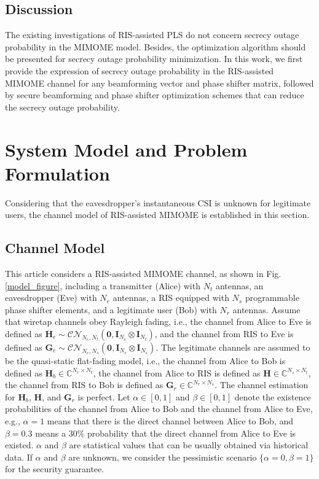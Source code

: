 \documentclass[journal]{IEEEtran}
\theoremstyle{definition}
\begin{document}
\subsection{Discussion}
The existing investigations of RIS-assisted PLS do not concern secrecy outage probability in the MIMOME model. Besides, the optimization algorithm should be presented for secrecy outage probability minimization. In this work, we first provide the expression of secrecy outage probability in the RIS-assisted MIMOME channel for any beamforming vector and phase shifter matrix, followed by secure beamforming and phase shifter optimization schemes that can reduce the secrecy outage probability.

\section{System Model and Problem Formulation}\label{model}

Considering that the eavesdropper's instantaneous CSI is unknown for legitimate users, the channel model of RIS-assisted MIMOME is established in this section. 

\subsection{Channel Model}

This article considers a RIS-assisted MIMOME channel, as shown in Fig. \ref{model_figure}, including a transmitter (Alice) with $N_t$ antennas, an eavesdropper (Eve) with $N_e$ antennas, a RIS equipped with $N_s$ programmable phase shifter elements, and a legitimate user (Bob) with $N_r$ antennas. Assume that wiretap channels obey  Rayleigh fading, i.e., the channel from Alice to Eve is defined as $\mathbf{H}_e\sim \mathcal{CN}_{N_e,N_t}(\mathbf{0},\mathbf{I}_{N_e}\otimes \mathbf{I}_{N_t})$, and the channel from RIS to Eve is defined as $\mathbf{G}_e\sim \mathcal{CN}_{N_e,N_s}(\mathbf{0},\mathbf{I}_{N_e}\otimes \mathbf{I}_{N_s})$. The legitimate channels are assumed to be the quasi-static flat-fading model, i.e., the channel from Alice to Bob is defined as $\mathbf{H}_b\in \mathbb{C}^{N_r\times N_t}$, the channel from Alice to RIS is defined as $\mathbf{H}\in \mathbb{C}^{N_s\times N_t}$, the channel from RIS to Bob is defined as $\mathbf{G}_{r}\in \mathbb{C}^{N_r\times N_s}$. The channel estimation for $\mathbf{H}_b$, $\mathbf{H}$, and $\mathbf{G}_r$ is perfect. Let $\alpha \in [0,1]$ and $\beta\in [0,1]$ denote the existence probabilities of the channel from Alice to Bob and the channel from Alice to Eve, e.g., $\alpha =1$ means that there is the direct channel between Alice to Bob, and $\beta =0.3$ means a $30\%$ probability that the direct channel from Alice to Eve is existed. $\alpha$ and $\beta$ are statistical values that can be usually obtained  via historical data. If $\alpha$ and $\beta$ are unknown, we consider the pessimistic scenario $\{\alpha=0,\beta=1\}$ for the security guarantee.
\end{document}
